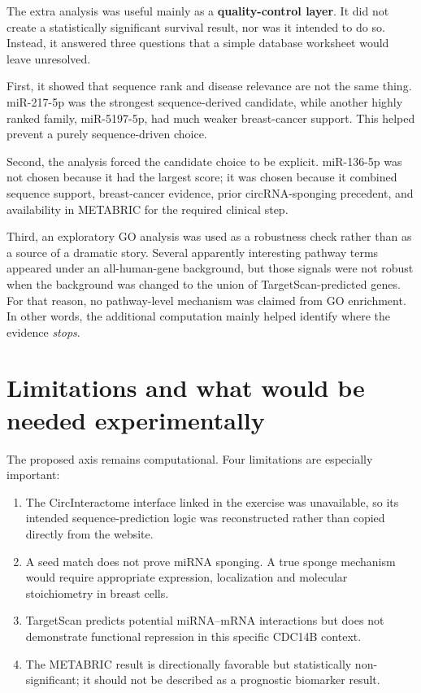 \documentclass[11pt]{article}
\begin{document}
The extra analysis was useful mainly as a \textbf{quality-control layer}. It did not create a statistically significant survival result, nor was it intended to do so. Instead, it answered three questions that a simple database worksheet would leave unresolved.

First, it showed that sequence rank and disease relevance are not the same thing. miR-217-5p was the strongest sequence-derived candidate, while another highly ranked family, miR-5197-5p, had much weaker breast-cancer support. This helped prevent a purely sequence-driven choice.

Second, the analysis forced the candidate choice to be explicit. miR-136-5p was not chosen because it had the largest score; it was chosen because it combined sequence support, breast-cancer evidence, prior circRNA-sponging precedent, and availability in METABRIC for the required clinical step.

Third, an exploratory GO analysis was used as a robustness check rather than as a source of a dramatic story. Several apparently interesting pathway terms appeared under an all-human-gene background, but those signals were not robust when the background was changed to the union of TargetScan-predicted genes. For that reason, no pathway-level mechanism was claimed from GO enrichment. In other words, the additional computation mainly helped identify where the evidence \emph{stops}.

\section{Limitations and what would be needed experimentally}

The proposed axis remains computational. Four limitations are especially important:

\begin{enumerate}
    \item The CircInteractome interface linked in the exercise was unavailable, so its intended sequence-prediction logic was reconstructed rather than copied directly from the website.
    \item A seed match does not prove miRNA sponging. A true sponge mechanism would require appropriate expression, localization and molecular stoichiometry in breast cells.
    \item TargetScan predicts potential miRNA--mRNA interactions but does not demonstrate functional repression in this specific CDC14B context.
    \item The METABRIC result is directionally favorable but statistically non-significant; it should not be described as a prognostic biomarker result.
\end{enumerate}
\end{document}
